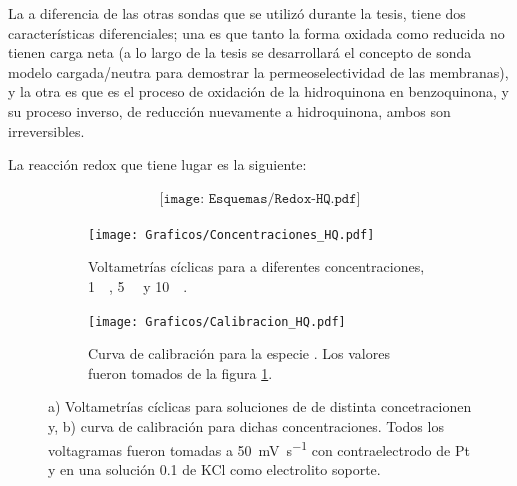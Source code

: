 {		 	 	 La \hq\space a diferencia de las otras sondas que se utilizó durante la tesis, tiene dos características diferenciales; una es que tanto la forma oxidada como reducida no tienen carga neta (a lo largo de la tesis se desarrollará el concepto de sonda modelo cargada/neutra para demostrar la permeoselectividad de las membranas),  y la otra es que es el proceso de oxidación de la hidroquinona en benzoquinona, y su proceso inverso, de reducción nuevamente a hidroquinona, ambos son irreversibles. 

		 	 	 La reacción redox que tiene lugar es la siguiente:
		 	 
		 	 	 				\begin{equation}
		 	 	 				\begin{aligned}
		 	 	 				\texttt{[image: Esquemas/Redox-HQ.pdf]}
		 	 	 				\end{aligned}
		 	 	 				\end{equation}
				 			\begin{figure}[ht]
				 	     \begin{subfigure}[t]{0.495\textwidth}
				         	\texttt{[image: Graficos/Concentraciones\_HQ.pdf]}
				        	\caption{Voltametrías cíclicas para \hq\space a diferentes concentraciones, \SI{1}{\milli\Molar}, \SI{5}{\milli\Molar} y \SI{10}{\milli\Molar}.}
				         	\label{fig:HQ_a}
				     		\end{subfigure}
			     		 \begin{subfigure}[t]{0.495\textwidth}
				        	\texttt{[image: Graficos/Calibracion\_HQ.pdf]}
				       		\caption{Curva de calibración para la especie \hq. Los valores fueron tomados de la figura \ref{fig:HQ_a}.}
				         	\label{fig:HQ_b}
				     		\end{subfigure}
				     	 \caption[Respuesta electroquímica para \hq]{a) Voltametrías cíclicas para soluciones de \hq\space de distinta concetracionen y, b) curva de calibración para dichas concentraciones. Todos los voltagramas fueron tomadas a \SI{50}{\milli\volt\per\second} con contraelectrodo de Pt y en una solución \SI{0.1}{\Molar} de KCl como electrolito soporte.}
			     		 \label{fig:HQ}
			     		 \end{figure} 
		 
}
